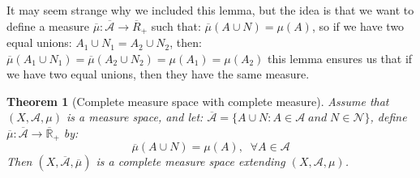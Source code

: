 \documentclass{article}
\newcommand{\A}{\mathcal{A}}
\newcommand{\Abar}{\overline{\mathcal{A}}}
\newcommand{\Rbar}{\overline{\mathbb{R}}}%
\newcommand{\Null}{\mathcal{N}}
\newtheorem{theorem}{Theorem}
\begin{document}
It may seem strange why we included this lemma, but the idea is that we want to define a measure $\overline{\mu}:\overline{\A}\to \overline{R}_{+}$ such that: $\overline{\mu}(A\cup N) = \mu(A)$, so if we have two equal unions: $A_{1}\cup N_{1} = A_{2}\cup N_{2}$, then: $\overline{\mu}(A_{1}\cup N_{1}) = \overline{\mu}(A_{2}\cup N_{2}) = \mu(A_{1}) = \mu(A_{2})$ this lemma ensures us that if we have two equal unions, then they have the same measure. 

\begin{theorem}[Complete measure space with complete measure]
Assume that $(X, \A, \mu)$ is a measure space, and let: $\Abar = \{A\cup N: A\in \A\; and\; N\in \Null \}$, define $\overline{\mu}:\Abar \to \Rbar_{+}$ by: 
\[\overline{\mu}(A\cup N) = \mu(A), \;\; \forall A\in \A
\]
Then $(X,\Abar, \overline{\mu})$ is a complete measure space extending $(X,\A,\mu)$. 
\end{theorem}
\end{document}
